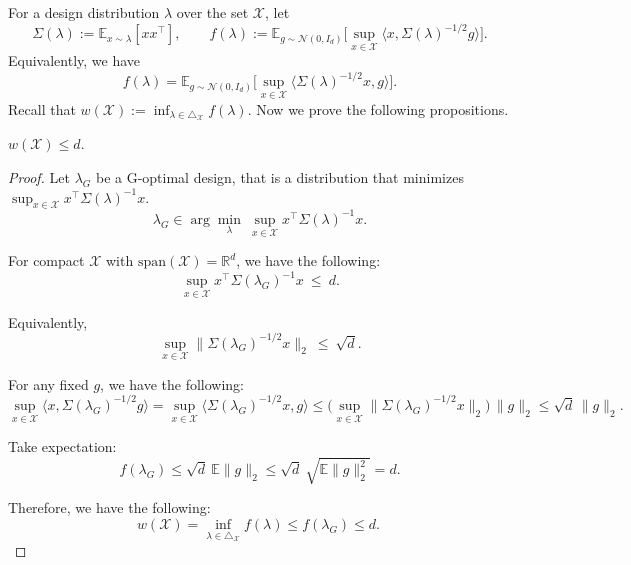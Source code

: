 For a design distribution $\lambda$ over the set $\mathcal{X}$, let
\[
\Sigma(\lambda):=\mathbb E_{x\sim\lambda}[xx^\top],\qquad
f(\lambda):=\mathbb E_{g\sim\mathcal N(0,I_d)}\Big[\sup_{x\in\mathcal X}\langle x,\Sigma(\lambda)^{-1/2}g\rangle\Big].
\]
Equivalently, we have
\[
f(\lambda)=\mathbb E_{g\sim\mathcal N(0,I_d)}\Big[\sup_{x\in\mathcal X}\langle \Sigma(\lambda)^{-1/2}x, g\rangle\Big].
\]
Recall that $w(\mathcal{X}):=\inf_{\lambda \in \triangle_{\mathcal{X}}}f(\lambda)$. Now we prove the following propositions. 

\begin{proposition}
    $w(\mathcal{X})\leq d$.
\end{proposition}
\begin{proof}



Let $\lambda_G$ be a G-optimal design, that is a distribution that minimizes $\sup_{x\in\mathcal X} x^\top \Sigma(\lambda)^{-1}x$.
\[
\lambda_G \in \arg\min_\lambda\ \sup_{x\in\mathcal X} x^\top \Sigma(\lambda)^{-1}x.
\]

For compact $\mathcal X$ with $\mathrm{span}(\mathcal X)=\mathbb R^d$, we have the following:
\[
\sup_{x\in\mathcal X} x^\top \Sigma(\lambda_G)^{-1}x \ \le\ d.
\]

Equivalently,
\[
\sup_{x\in\mathcal X}\|\Sigma(\lambda_G)^{-1/2}x\|_2 \ \le\ \sqrt d.
\]

 For any fixed $g$, we have the following:
\[
\sup_{x\in\mathcal X}\langle x,\Sigma(\lambda_G)^{-1/2}g\rangle
=\sup_{x\in\mathcal X}\langle \Sigma(\lambda_G)^{-1/2}x, g\rangle
\le \Big(\sup_{x\in\mathcal X}\|\Sigma(\lambda_G)^{-1/2}x\|_2\Big)\,\|g\|_2
\le \sqrt d\,\|g\|_2.
\]

Take expectation:
\[
f(\lambda_G)\le \sqrt d\ \mathbb E\|g\|_2\leq \sqrt d\ \sqrt{\mathbb E\|g\|_2^2}=d.
\]

Therefore, we have the following:
\[
 w(\mathcal{X})=\inf_{\lambda\in\triangle_{\mathcal{X}}} f(\lambda) \le f(\lambda_G) \le d.\
\]
\end{proof}

